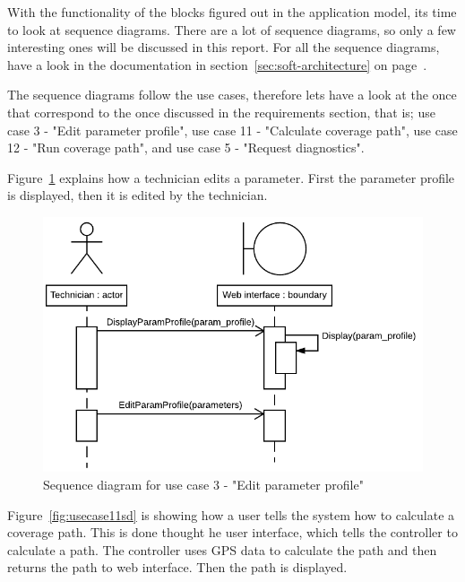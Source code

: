 With the functionality of the blocks figured out in the application model, its time to look at sequence diagrams. There are a lot of sequence diagrams, so only a few interesting ones will be discussed in this report. For all the sequence diagrams, have a look in the documentation in section~\ref{sec:soft-architecture} on page~\pageref{sec:soft-architecture}.

The sequence diagrams follow the use cases, therefore lets have a look at the once that correspond to the once discussed in the requirements section, that is; use case 3 - "Edit parameter profile", use case 11 - "Calculate coverage path", use case 12 - "Run coverage path", and use case 5 - "Request diagnostics". 

Figure~\ref{fig:usecase3sd} explains how a technician edits a parameter. First the parameter profile is displayed, then it is edited by the technician.  

\begin{figure}[H]
\centering
\includegraphics[width=1\linewidth]{../Appendix/Project/Dokumentation/Images/System_architecture/Use_case_3_SD}
\caption{Sequence diagram for use case 3 - "Edit parameter profile"}
\label{fig:usecase3sd}
\end{figure}

Figure~\ref{fig:usecase11sd} is showing how a user tells the system how to calculate a coverage path. This is done thought he user interface, which tells the controller to calculate a path. The controller uses GPS data to calculate the path and then returns the path to web interface. Then the path is displayed.

